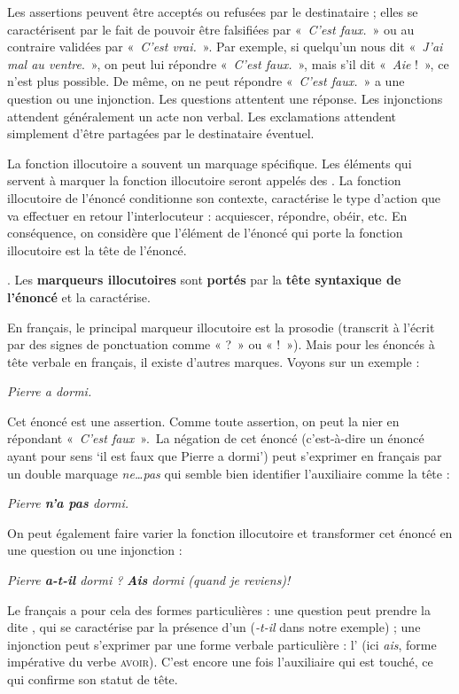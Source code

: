 Les assertions peuvent être acceptés ou refusées par le destinataire ; elles se caractérisent par le fait de pouvoir être falsifiées par «~\textit{C’est faux.}~» ou au contraire validées par «~\textit{C’est vrai.}~». Par exemple, si quelqu’un nous dit «~\textit{J’ai mal au ventre}.~», on peut lui répondre «~\textit{C’est faux.}~», mais s’il dit «~\textit{Aie} !~», ce n’est plus possible. De même, on ne peut répondre «~\textit{C’est faux.}~» a une question ou une injonction. Les questions attentent une réponse. Les injonctions attendent généralement un acte non verbal. Les exclamations attendent simplement d’être partagées par le destinataire éventuel.

La fonction illocutoire a souvent un marquage spécifique. Les éléments qui servent à marquer la fonction illocutoire seront appelés des . La fonction illocutoire de l'énoncé conditionne son contexte, caractérise le type d'action que va effectuer en retour l'interlocuteur : acquiescer, répondre, obéir, etc. En conséquence, on considère que l'élément de l'énoncé qui porte la fonction illocutoire est la tête de l'énoncé.

{. Les \textbf{marqueurs illocutoires} sont \textbf{portés} par la \textbf{tête syntaxique de l’énoncé} et la caractérise.}

En français, le principal marqueur illocutoire est la prosodie (transcrit à l’écrit par des signes de ponctuation comme « ?~» ou « !~»). Mais pour les énoncés à tête verbale en français, il existe d’autres marques. Voyons sur un exemple :

\ea
\textit{{Pierre a dormi}.}
\z

Cet énoncé est une assertion. Comme toute assertion, on peut la nier en répondant «~\textit{C’est faux}~».~La négation de cet énoncé (c'est-à-dire un énoncé ayant pour sens ‘il est faux que Pierre a dormi’) peut s’exprimer en français par un double marquage \textit{ne…pas} qui semble bien identifier l’auxiliaire comme la tête :

\ea
\textit{{Pierre} \textbf{{n’a}  {pas}}  {dormi.}}
\z

On peut également faire varier la fonction illocutoire et transformer cet énoncé en une question ou une injonction :

\ea
  \ea \textit{Pierre \textbf{a-t-il} dormi ?}
  \ex \textit{\textbf{Ais}  dormi (quand  je reviens)!}
  \z
\z

Le français a pour cela des formes particulières : une question peut prendre la  dite , qui se caractérise par la présence d’un  (\textit{{}-t-il} dans notre exemple) ; une injonction peut s’exprimer par une forme verbale particulière : l’ (ici \textit{ais}, forme impérative du verbe \textsc{avoir}). C’est encore une fois l’auxiliaire qui est touché, ce qui confirme son statut de tête.

